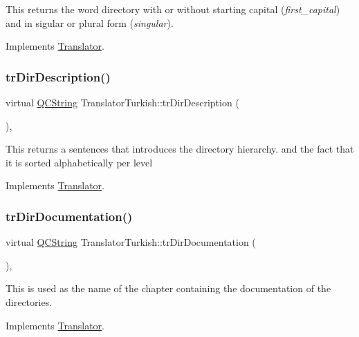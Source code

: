 This returns the word directory with or without starting capital ({\itshape first\+\_\+capital}) and in sigular or plural form ({\itshape singular}). 

Implements \mbox{\hyperlink{class_translator}{Translator}}.

\mbox{\label{class_translator_turkish_a437ac9e145105307e53c4c3ee9d268e9}} 
\subsubsection{\texorpdfstring{trDirDescription()}{trDirDescription()}}
{\footnotesize\ttfamily virtual \mbox{\hyperlink{class_q_c_string}{Q\+C\+String}} Translator\+Turkish\+::tr\+Dir\+Description (\begin{DoxyParamCaption}{ }\end{DoxyParamCaption})\hspace{0.3cm}{\ttfamily [inline]}, {\ttfamily [virtual]}}

This returns a sentences that introduces the directory hierarchy. and the fact that it is sorted alphabetically per level 

Implements \mbox{\hyperlink{class_translator}{Translator}}.

\mbox{\label{class_translator_turkish_ad93f9eedecf5615f4877a6b1f1bc039a}} 
\subsubsection{\texorpdfstring{trDirDocumentation()}{trDirDocumentation()}}
{\footnotesize\ttfamily virtual \mbox{\hyperlink{class_q_c_string}{Q\+C\+String}} Translator\+Turkish\+::tr\+Dir\+Documentation (\begin{DoxyParamCaption}{ }\end{DoxyParamCaption})\hspace{0.3cm}{\ttfamily [inline]}, {\ttfamily [virtual]}}

This is used as the name of the chapter containing the documentation of the directories. 

Implements \mbox{\hyperlink{class_translator}{Translator}}.

